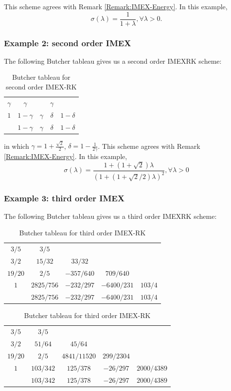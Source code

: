 This scheme agrees with Remark \ref{Remark:IMEX-Energy}. 
In this example,
$$\sigma(\lambda) = \frac{1}{1+\lambda}, \forall \lambda > 0.$$


\subsubsection{Example 2: second order IMEX}
The following Butcher tableau gives us a second order IMEXRK scheme:
\begin{table}[h]
    \centering
    \begin{tabular}[h]{c|cc|cc}
        $\gamma$ & $\gamma$ & ~ & $\gamma$ & ~\\
        $1$ & $1- \gamma$ & $\gamma$ & $\delta$ & $1-\delta$\\
        \hline
        ~ & $1- \gamma$ & $\gamma$ & $\delta$ & $1-\delta$
    \end{tabular}
    \caption{Butcher tableau for second order IMEX-RK}\label{tab:imex2}
\end{table}

in which $\gamma = 1+\frac{\sqrt{2}}2$, $\delta = 1-\frac1{2\gamma}$.
This scheme agrees with Remark \ref{Remark:IMEX-Energy}. 
In this example,
$$\sigma(\lambda) = \frac{1+(1+\sqrt2)\lambda}{(1+(1+\sqrt2/2)\lambda)^2}, \forall \lambda > 0$$

\subsubsection{Example 3: third order IMEX}
The following Butcher tableau gives us a third order IMEXRK scheme:
\begin{table}[h]
    \centering
    \begin{tabular}[h]{c|cccc}
        $3/5$ & $3/5$  \\
        $3/2$ & $15/32$ & $33/32$    \\
        $19/20$ & $2/5$ & $-357/640$  &$709/640$ \\
        $1$ & $2825/756$ & $-232/297$  &$-6400/231$ & $103/4$ \\
        \hline
        ~ &  $2825/756$ & $-232/297$  &$-6400/231$ & $103/4$ \\
    \end{tabular}
    \begin{tabular}[h]{c|cccc}
        $3/5$ & $3/5$ \\
        $3/2$ &  $51/64$ & $45/64$  \\
        $19/20$ &  $2/5$ & $4841/11520$  & $299/2304$ \\
        $1$ &  $103/342$ & $125/378$  & $-26/297$ & $2000/4389$\\
        \hline
        ~ &  $103/342$ & $125/378$  & $-26/297$ & $2000/4389$\\
    \end{tabular}
    \caption{Butcher tableau for third order IMEX-RK}
\end{table}

